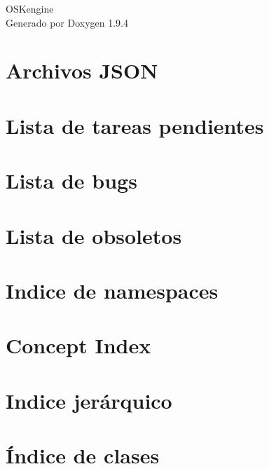 \documentclass[twoside]{book}
\newcommand{\+}{\discretionary{\mbox{\scriptsize$\hookleftarrow$}}{}{}}
\newcommand{\clearemptydoublepage}{%
    \newpage{\pagestyle{empty}\cleardoublepage}%
  }
\begin{document}
  \raggedbottom
    \hypersetup{pageanchor=false,
                bookmarksnumbered=true,
                pdfencoding=unicode
               }
  \begin{titlepage}
  \vspace*{7cm}
  \begin{center}%
  {\Large OSKengine}\\
  \vspace*{1cm}
  {\large Generado por Doxygen 1.9.4}\\
  \end{center}
  \end{titlepage}
  \clearemptydoublepage
  \tableofcontents
  \clearemptydoublepage
  \hypersetup{pageanchor=true}
\chapter{Archivos JSON}
\label{jsonfiles}

\chapter{Lista de tareas pendientes}
\label{todo}

\chapter{Lista de bugs}
\label{bug}

\chapter{Lista de obsoletos}
\label{deprecated}

\chapter{Indice de namespaces}

\chapter{Concept Index}

\chapter{Indice jerárquico}

\chapter{Índice de clases}

\end{document}

